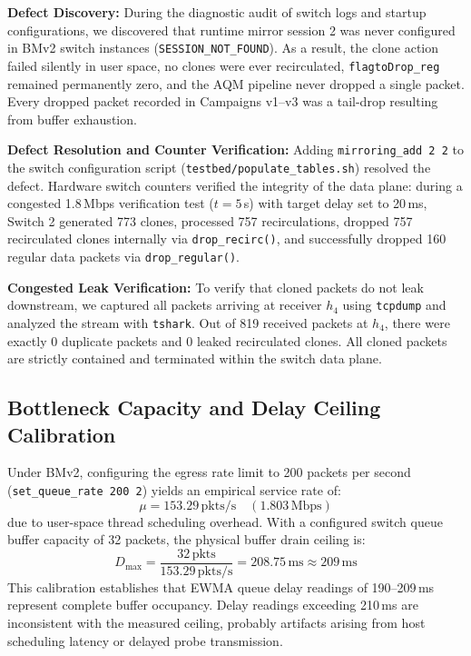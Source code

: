 \documentclass[12pt,a4paper,oneside]{report}
\begin{document}
\textbf{Defect Discovery:} During the diagnostic audit of switch logs and startup configurations, we discovered that runtime mirror session 2 was never configured in BMv2 switch instances (\texttt{SESSION\_NOT\_FOUND}). As a result, the clone action failed silently in user space, no clones were ever recirculated, \texttt{flagtoDrop\_reg} remained permanently zero, and the AQM pipeline never dropped a single packet. Every dropped packet recorded in Campaigns v1–v3 was a tail-drop resulting from buffer exhaustion.

\textbf{Defect Resolution and Counter Verification:} Adding \texttt{mirroring\_add 2 2} to the switch configuration script (\texttt{testbed/populate\_tables.sh}) resolved the defect. Hardware switch counters verified the integrity of the data plane: during a congested 1.8\,Mbps verification test ($t=5$\,s) with target delay set to 20\,ms, Switch 2 generated 773 clones, processed 757 recirculations, dropped 757 recirculated clones internally via \texttt{drop\_recirc()}, and successfully dropped 160 regular data packets via \texttt{drop\_regular()}.

\textbf{Congested Leak Verification:} To verify that cloned packets do not leak downstream, we captured all packets arriving at receiver $h_4$ using \texttt{tcpdump} and analyzed the stream with \texttt{tshark}. Out of 819 received packets at $h_4$, there were exactly 0 duplicate packets and 0 leaked recirculated clones. All cloned packets are strictly contained and terminated within the switch data plane.

\subsection{Bottleneck Capacity and Delay Ceiling Calibration}
Under BMv2, configuring the egress rate limit to 200 packets per second (\texttt{set\_queue\_rate 200 2}) yields an empirical service rate of:
\begin{equation}
  \mu = 153.29\,\text{pkts/s} \quad (1.803\,\text{Mbps})
\end{equation}
due to user-space thread scheduling overhead. With a configured switch queue buffer capacity of 32 packets, the physical buffer drain ceiling is:
\begin{equation}
  D_{\max} = \frac{32\,\text{pkts}}{153.29\,\text{pkts/s}} = 208.75\,\text{ms} \approx 209\,\text{ms}
\end{equation}
This calibration establishes that EWMA queue delay readings of 190--209\,ms represent complete buffer occupancy. Delay readings exceeding 210\,ms are inconsistent with the measured ceiling, probably artifacts arising from host scheduling latency or delayed probe transmission.
\end{document}
